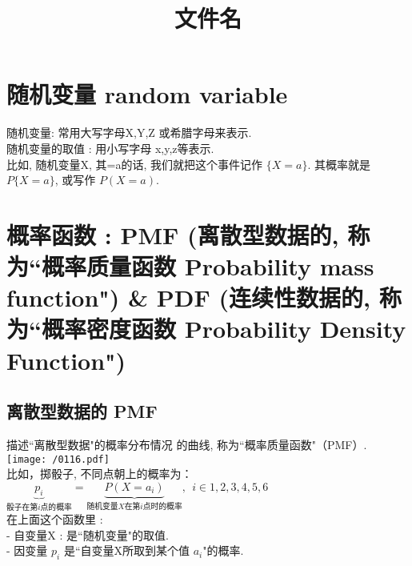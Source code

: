 \documentclass[UTF8]{ctexart}
\title{文件名}
\begin{document}
	\tableofcontents %
	\date{} %
	\maketitle  %
	
		
	

\section{ 随机变量 random variable}
	
	随机变量: 常用大写字母X,Y,Z 或希腊字母来表示. \\
	随机变量的取值 : 用小写字母 x,y,z等表示. \\
	
比如, 随机变量X,  其=a的话, 我们就把这个事件记作 $\{X=a\}$.  其概率就是 $ P\{X=a\}$, 或写作 $P(X=a)$. \\







	
\section{概率函数 : PMF (离散型数据的, 称为``概率质量函数 Probability mass function") \& PDF (连续性数据的, 称为``概率密度函数 Probability Density Function")}	




\subsection{离散型数据的 PMF}

描述``离散型数据"的概率分布情况 的曲线, 称为``概率质量函数"（PMF）. \\

\texttt{[image: /0116.pdf]} \\

比如，掷骰子, 不同点朝上的概率为：$
\underset{\text{骰子在第}i\text{点的概率}}{\underbrace{p_i}}=\underset{\text{随机变量}X\text{在第}i\text{点时的概率}}{\underbrace{P(X=a_i)}},\ \ i\in 1,2,3,4,5,6
$ \\

在上面这个函数里 : \\
- 自变量X : 是``随机变量"的取值. \\
- 因变量  $ p_i$ 是``自变量X所取到某个值 $a_i$"的概率. \\
\end{document}
